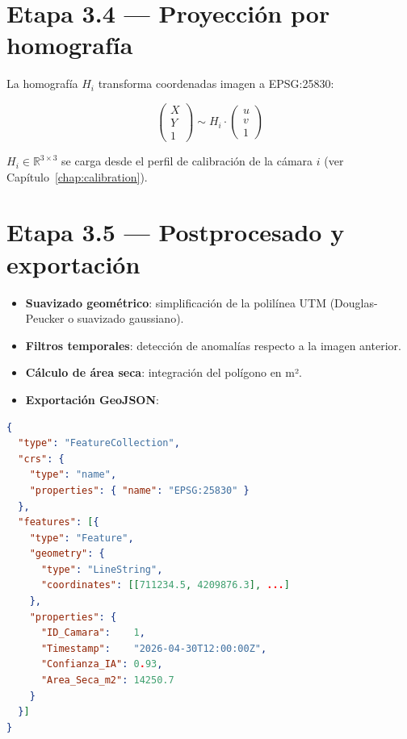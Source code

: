 \section{Etapa 3.4 --- Proyección por homografía}

La homografía $H_i$ transforma coordenadas imagen a EPSG:25830:

\[
  \begin{pmatrix} X \\ Y \\ 1 \end{pmatrix}
  \sim H_i \cdot
  \begin{pmatrix} u \\ v \\ 1 \end{pmatrix}
\]

$H_i \in \mathbb{R}^{3\times3}$ se carga desde el perfil de calibración
de la cámara $i$ (ver Capítulo~\ref{chap:calibration}).

\section{Etapa 3.5 --- Postprocesado y exportación}

\begin{itemize}
  \item \textbf{Suavizado geométrico}: simplificación de la polilínea UTM
        (Douglas-Peucker o suavizado gaussiano).
  \item \textbf{Filtros temporales}: detección de anomalías respecto a la
        imagen anterior.
  \item \textbf{Cálculo de área seca}: integración del polígono en m².
  \item \textbf{Exportación GeoJSON}:
\end{itemize}

\begin{lstlisting}[language=json, caption={Estructura GeoJSON de salida (EPSG:25830)}]
{
  "type": "FeatureCollection",
  "crs": {
    "type": "name",
    "properties": { "name": "EPSG:25830" }
  },
  "features": [{
    "type": "Feature",
    "geometry": {
      "type": "LineString",
      "coordinates": [[711234.5, 4209876.3], ...]
    },
    "properties": {
      "ID_Camara":    1,
      "Timestamp":    "2026-04-30T12:00:00Z",
      "Confianza_IA": 0.93,
      "Area_Seca_m2": 14250.7
    }
  }]
}
\end{lstlisting}
